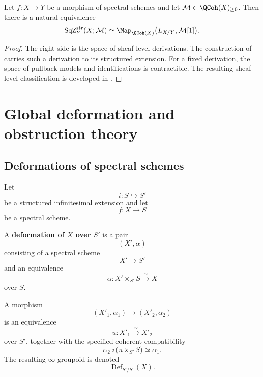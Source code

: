 \begin{theorem}
\label{thm:global-structured-square-zero-classification}
Let $f:X\to Y$ be a morphism of spectral schemes and let
$\mathcal M\in\QCoh(X)_{\geq0}$. Then there is a natural equivalence
\[
    \operatorname{SqZ}^{\mathrm{str}}_Y(X;\mathcal M)
    \simeq
    \Map_{\QCoh(X)}
    \bigl(
        L_{X/Y},
        \mathcal M[1]
    \bigr).
\]
\end{theorem}

\begin{proof}
The right side is the space of sheaf-level derivations. The construction
of  carries such a derivation to
its structured extension. For a fixed derivation, the space of pullback
models and identifications is contractible. The resulting sheaf-level
classification is developed in \cite[Section~17.1.3]{LurieSAG}.
\end{proof}

\section{Global deformation and obstruction theory}
\label{sec:global-spectral-deformation-theory}

\subsection{Deformations of spectral schemes}

\begin{definition}
\label{def:global-deformation-infinitesimal}
Let
\[
    i
    \colon
    S
    \hookrightarrow
    S'
\]
be a structured infinitesimal extension and let
\[
    f
    \colon
    X
    \longrightarrow
    S
\]
be a spectral scheme.

A \textbf{deformation of \(X\) over \(S'\)} is a pair
\[
    (X',\alpha)
\]
consisting of a spectral scheme
\[
    X'
    \longrightarrow
    S'
\]
and an equivalence
\[
    \alpha
    \colon
    X'\times_{S'}S
    \xrightarrow{\simeq}
    X
\]
over \(S\).

A morphism
\[
    (X'_1,\alpha_1)
    \longrightarrow
    (X'_2,\alpha_2)
\]
is an equivalence
\[
    u
    \colon
    X'_1
    \xrightarrow{\simeq}
    X'_2
\]
over \(S'\), together with the specified coherent compatibility
\[
    \alpha_2
    \circ
    \bigl(
        u\times_{S'}S
    \bigr)
    \simeq
    \alpha_1.
\]
The resulting \(\infty\)-groupoid is denoted
\[
    \operatorname{Def}_{S'/S}(X).
\]
\end{definition}

